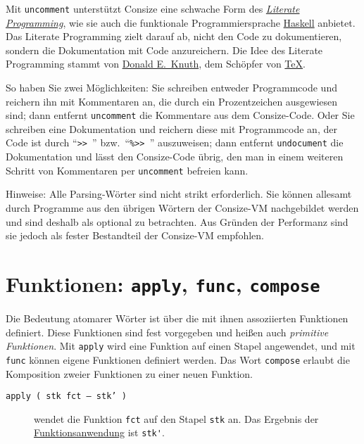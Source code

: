 Mit \verb|uncomment| unterstützt Consize eine schwache Form des \href{http://de.wikipedia.org/wiki/Literate\_programming}{\emph{Literate Programming}}, wie sie auch die funktionale Programmiersprache \href{http://de.wikipedia.org/wiki/Haskell\_(Programmiersprache)}{Haskell} anbietet. Das Literate Programming zielt darauf ab, nicht den Code zu dokumentieren, sondern die Dokumentation mit Code anzureichern. Die Idee des Literate Programming stammt von \href{http://de.wikipedia.org/wiki/Donald_Ervin_Knuth}{Donald E.\ Knuth}, dem Schöpfer von \href{http://de.wikipedia.org/wiki/TeX}{\TeX}.

So haben Sie zwei Möglichkeiten: Sie schreiben entweder Programmcode und reichern ihn mit Kommentaren an, die durch ein Prozentzeichen ausgewiesen sind; dann entfernt \verb|uncomment| die Kommentare aus dem Consize-Code. Oder Sie schreiben eine Dokumentation und reichern diese mit Programmcode an, der Code ist durch "`\verb|>> |"' bzw.\ "`\verb|%>> |"'
auszuweisen; dann entfernt \verb|undocument| die Dokumentation und lässt den Consize-Code übrig, den man in einem weiteren Schritt von Kommentaren per \verb|uncomment| befreien kann.

Hinweise: Alle Parsing-Wörter sind nicht strikt erforderlich. Sie können allesamt durch Programme aus den übrigen Wörtern der Consize-VM nachgebildet werden und sind deshalb als optional zu betrachten. Aus Gründen der Performanz sind sie jedoch als fester Bestandteil der Consize-VM empfohlen. 

\section{Funktionen: \texttt{apply}, \texttt{func}, \texttt{compose}}

Die Bedeutung atomarer Wörter ist über die mit ihnen assoziierten Funktionen definiert. Diese Funktionen sind fest vorgegeben und heißen auch \emph{primitive Funktionen}. Mit \verb|apply| wird eine Funktion auf einen Stapel angewendet, und mit \verb|func| können eigene Funktionen definiert werden. Das Wort \verb|compose| erlaubt die Komposition zweier Funktionen zu einer neuen Funktion.

\begin{description}
\item[\texttt{apply ( stk fct -- stk' )}] wendet die Funktion \verb|fct| auf den Stapel \verb|stk| an. Das Ergebnis der \href{http://en.wikipedia.org/wiki/Apply}{Funktionsanwendung} ist \verb|stk'|.
\end{description}

